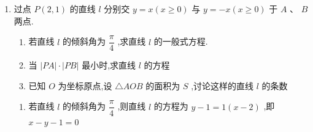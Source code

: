 \begin{enumerate}
\begin{jieda}
\begin{enumerate}
            $\vv{CB} = (4, -2), \vv{CA} = (m+2, n-3)$，$S = \dfrac{1}{2} \times |4(n-3) - (-2)(m+2)| = 7 \Longrightarrow \left| {m + {2n} - 4}\right|  = 7$
            
            因此有 $\left\{  \begin{array}{l} m + {2n} - 4 = 7 \\  {2m} - {3n} + 6 = 0 \end{array}\right.$ 或 $\left\{  \begin{array}{l} m + {2n} - 4 =  - 7 \\  {2m} - {3n} + 6 = 0 \end{array}\right.$ ,解得： $\left\{  \begin{array}{l} m = 3 \\  n = 4 \end{array}\right.$ 或 $\left\{  \begin{array}{l} m =  - 3 \\  n = 0 \end{array}\right.$，所以点 $A$ 的坐标为:$(3,4)$或$(-3,0)$.
        \end{enumerate}
    \end{jieda}
    
    \item 过点 $P\left( {2,1}\right)$ 的直线 $l$ 分别交 $y = x\left( {x \geq  0}\right)$ 与 $y =  - x\left( {x \geq  0}\right)$ 于 $A\text{ 、 }B$ 两点.
    \begin{enumerate}
        \item 若直线 $l$ 的倾斜角为 $\dfrac{\pi }{4}$ ,求直线 $l$ 的一般式方程.
        \item 当 $\left| {PA}\right|  \cdot  \left| {PB}\right|$ 最小时,求直线 $l$ 的方程
        \item 已知 $O$ 为坐标原点,设 $\triangle{AOB}$ 的面积为 ${S}$ ,讨论这样的直线 $l$ 的条数
    \end{enumerate}
    \begin{jieda}
        \begin{enumerate}
            \item 若直线 $l$ 的倾斜角为 $\dfrac{\pi }{4}$ ,则直线 $l$ 的方程为 $y - 1 = 1\left( {x - 2}\right)$ ,即 $x - y - 1 = 0$ 
            

\end{enumerate}
\end{jieda}
\end{enumerate}
